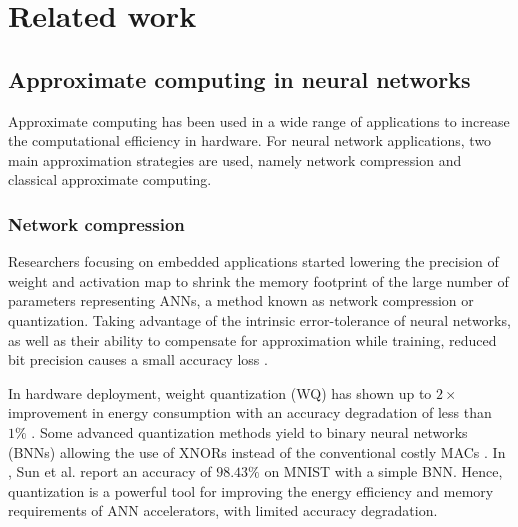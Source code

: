 \section{Related work}
\label{sec:related_work}
\subsection{Approximate computing in neural networks}
Approximate computing has been used in a wide range of applications to increase the computational efficiency in hardware\cite{han2013approximate}. For neural network applications, two main approximation strategies are used, namely network compression and classical approximate computing\cite{bouvier2019spiking}.

\subsubsection{Network compression}
Researchers focusing on embedded applications started lowering the precision of weight and activation map to shrink the memory footprint of the large number of parameters representing ANNs, a method known as network compression or quantization. Taking advantage of the intrinsic error-tolerance of neural networks, as well as their ability to compensate for approximation while training, reduced bit precision causes a small accuracy loss \cite{courbariaux2015binaryconnect, han2015deep, hubara2017quantized, rastegari2016xnor}.

In hardware deployment, weight quantization (WQ) has shown up to $2\times$ improvement in energy consumption with an accuracy degradation of less than $1\%$ \cite{moons20160, whatmough201714}. Some advanced quantization methods yield to binary neural networks (BNNs) allowing the use of XNORs instead of the conventional costly MACs \cite{rastegari2016xnor}. In \cite{sun2018xnor}, Sun et al. report an accuracy of $98.43\%$ on MNIST with a simple BNN. Hence, quantization is a powerful tool for improving the energy efficiency and memory requirements of ANN accelerators, with limited accuracy degradation.


